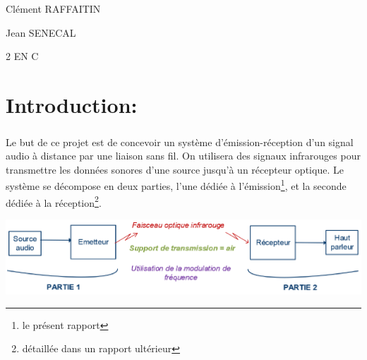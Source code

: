 \documentclass[a4paper]{report}
\begin{document}
\vspace{0.5cm}

\begin{minipage}{0.4\textwidth}
  \begin{flushleft} \large   
    Clément \textsc{RAFFAITIN} 
  \end{flushleft}
\end{minipage}
\begin{minipage}{0.4\textwidth}
  \begin{flushright} \large
    Jean \textsc{SENECAL} 
  \end{flushright}
\end{minipage}
\vfill

{\large 2 EN C}

\flushleft        
\newpage

\setcounter{tocdepth}{3}
\tableofcontents



\newpage


\flushleft
	
\chapter*{Introduction:}



\paragraph{}
Le but de ce projet est de concevoir un système d’émission-réception d'un signal audio à distance par une liaison sans fil. On utilisera des signaux infrarouges pour transmettre les données sonores d’une source jusqu’à un récepteur optique. Le système se décompose en deux parties, l’une dédiée à l’émission\footnote{le présent rapport}, et la seconde dédiée à la réception\footnote{détaillée dans un rapport ultérieur}.\\

\vspace{1cm}

\begin{center}
\includegraphics[width=1\textwidth]{parties.PNG}
\end{center}
\end{document}
